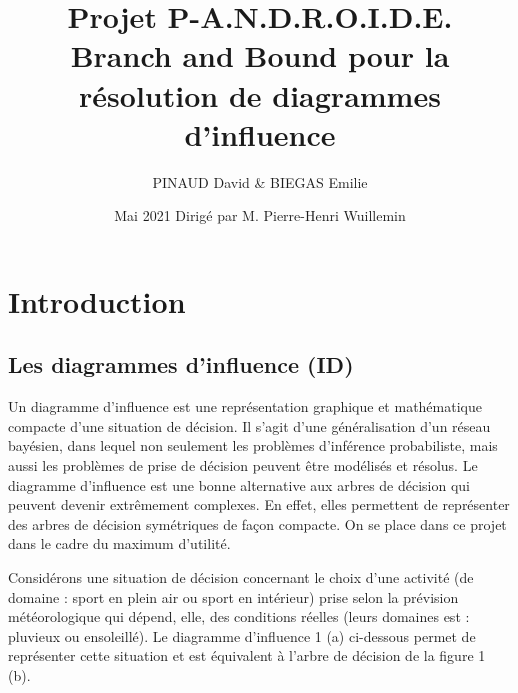 \documentclass[12pt]{article}
\title{Projet P-A.N.D.R.O.I.D.E.\\
\bigbreak\textbf{Branch and Bound pour la résolution de diagrammes d'influence}}
\author{PINAUD David \& BIEGAS Emilie}
\date{Mai 2021 \bigbreak Dirigé par M. Pierre-Henri Wuillemin}
\affil{Université Sorbonne Sciences}
\begin{document}
\maketitle

\renewcommand{\contentsname}{Table des Matières}
\pagebreak
\tableofcontents
\pagebreak

\section{Introduction}

\subsection{Les diagrammes d'influence (ID)}
Un diagramme d'influence est une représentation graphique et mathématique compacte d'une situation de décision. Il s'agit d'une généralisation d'un réseau bayésien, dans lequel non seulement les problèmes d'inférence probabiliste, mais aussi les problèmes de prise de décision peuvent être modélisés et résolus. 
Le diagramme d'influence est une bonne alternative aux arbres de décision qui peuvent devenir extrêmement complexes. En effet, elles permettent de représenter des arbres de décision symétriques de façon compacte. On se place dans ce projet dans le cadre du maximum d'utilité.

Considérons une situation de décision concernant le choix d'une activité (de domaine : sport en plein air ou sport en intérieur) prise selon la prévision météorologique qui dépend, elle, des conditions réelles (leurs domaines est : pluvieux ou ensoleillé). Le diagramme d'influence 1 (a) ci-dessous permet de représenter cette situation et est équivalent à l'arbre de décision de la figure 1 (b).
\end{document}

